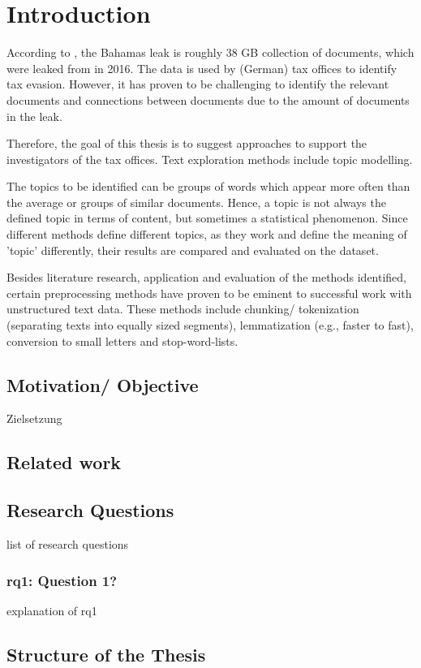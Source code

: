 \chapter{Introduction}\label{ch:introduction}

According to \cite{data-corpus-bahamas-leaks}, the Bahamas leak is roughly 38 GB collection of documents, which were leaked from in 2016.
The data is used by (German) tax offices to identify tax evasion.
However, it has proven to be challenging to identify the relevant documents and connections between documents due to the amount of documents in the leak.

Therefore, the goal of this thesis is to suggest approaches to support the investigators of the tax offices.
Text exploration methods include topic modelling.

The topics to be identified can be groups of words which appear more often than the average or groups of similar documents.
Hence, a topic is not always the defined topic in terms of content, but sometimes a statistical phenomenon.
Since different methods define different topics, as they work and define the meaning of 'topic' differently, 
their results are compared and evaluated on the dataset.

Besides literature research, application and evaluation of the methods identified, 
certain preprocessing methods have proven to be eminent to successful work with unstructured text data.
These methods include chunking/ tokenization (separating texts into equally sized segments), lemmatization (e.g., faster to fast), 
conversion to small letters and stop-word-lists.

\section{Motivation/ Objective}\label{sec:motivation}
Zielsetzung


\section{Related work}\label{sec:related-work}


\section{Research Questions}\label{sec:research-questions}

list of research questions
\subsection[\acs{rq}1]{\ac{rq}1: Question 1?}\label{subsec:rq1}
explanation of \ac{rq}1


\section{Structure of the Thesis}\label{sec:structure-of-the-thesis}